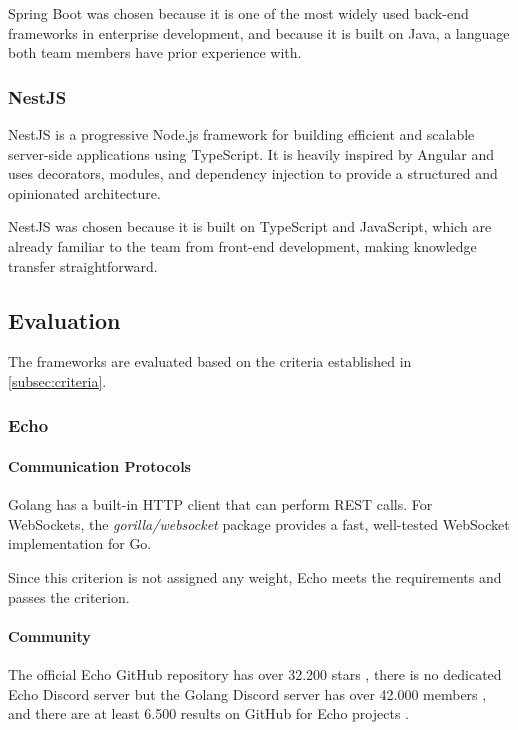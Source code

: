 Spring Boot was chosen because it is one of the most widely used back-end frameworks in enterprise development, and because it is built on Java, a language both team members have prior experience with.

\subsubsection{NestJS}\label{subsubsec:frameworks-nestjs}
NestJS is a progressive Node.js framework for building efficient and scalable server-side applications using TypeScript.
It is heavily inspired by Angular and uses decorators, modules, and dependency injection to provide a structured and opinionated architecture. \cite{bib:nestjs-framework}

NestJS was chosen because it is built on TypeScript and JavaScript, which are already familiar to the team from front-end development, making knowledge transfer straightforward.

\subsection{Evaluation}\label{subsec:evaluation}
The frameworks are evaluated based on the criteria established in \cref{subsec:criteria}.

\subsubsection{Echo}\label{subsubsec:evaluation-echo}

\paragraph{Communication Protocols}
Golang has a built-in HTTP client that can perform REST calls. \cite{bib:golang-http-client}
For WebSockets, the \emph{gorilla/websocket} package provides a fast, well-tested WebSocket implementation for Go. \cite{bib:gorilla-websocket}

Since this criterion is not assigned any weight, Echo meets the requirements and passes the criterion.

\paragraph{Community}
The official Echo GitHub repository has over 32.200 stars \cite{bib:echo-github}, there is no dedicated Echo Discord server but the Golang Discord server has over 42.000 members \cite{bib:golang-discord}, and there are at least 6.500 results on GitHub for Echo projects \cite{bib:echo-github-search}.

